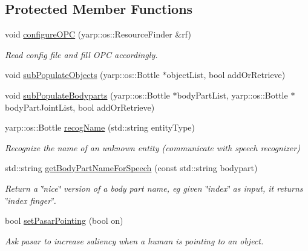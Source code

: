 \subsection*{Protected Member Functions}
\begin{DoxyCompactItemize}
\item 
void \hyperlink{classproactiveTagging_a8765b5f24e822956a835baf9f2097a5f}{configure\+O\+PC} (yarp\+::os\+::\+Resource\+Finder \&rf)
\begin{DoxyCompactList}\small\item\em Read config file and fill O\+PC accordingly. \end{DoxyCompactList}\item 
void \hyperlink{classproactiveTagging_ab7f6a446c71a7bc9416472fd8a59cac2}{sub\+Populate\+Objects} (yarp\+::os\+::\+Bottle $\ast$object\+List, bool add\+Or\+Retrieve)
\item 
void \hyperlink{classproactiveTagging_ae3566ba1d23f67b927f2fe4e624505d2}{sub\+Populate\+Bodyparts} (yarp\+::os\+::\+Bottle $\ast$body\+Part\+List, yarp\+::os\+::\+Bottle $\ast$body\+Part\+Joint\+List, bool add\+Or\+Retrieve)
\item 
yarp\+::os\+::\+Bottle \hyperlink{classproactiveTagging_aaf4838d9ca0569c9cfbe14f406c9fa04}{recog\+Name} (std\+::string entity\+Type)
\begin{DoxyCompactList}\small\item\em Recognize the name of an unknown entity (communicate with speech recognizer) \end{DoxyCompactList}\item 
std\+::string \hyperlink{classproactiveTagging_a59ee98016936f16bd5aeb4f23e10563a}{get\+Body\+Part\+Name\+For\+Speech} (const std\+::string bodypart)
\begin{DoxyCompactList}\small\item\em Return a \char`\"{}nice\char`\"{} version of a body part name, eg given \char`\"{}index\char`\"{} as input, it returns \char`\"{}index finger\char`\"{}. \end{DoxyCompactList}\item 
bool \hyperlink{classproactiveTagging_a277e15d7575cbd390dac6acd248a0efe}{set\+Pasar\+Pointing} (bool on)
\begin{DoxyCompactList}\small\item\em Ask pasar to increase saliency when a human is pointing to an object. \end{DoxyCompactList}\end{DoxyCompactItemize}
